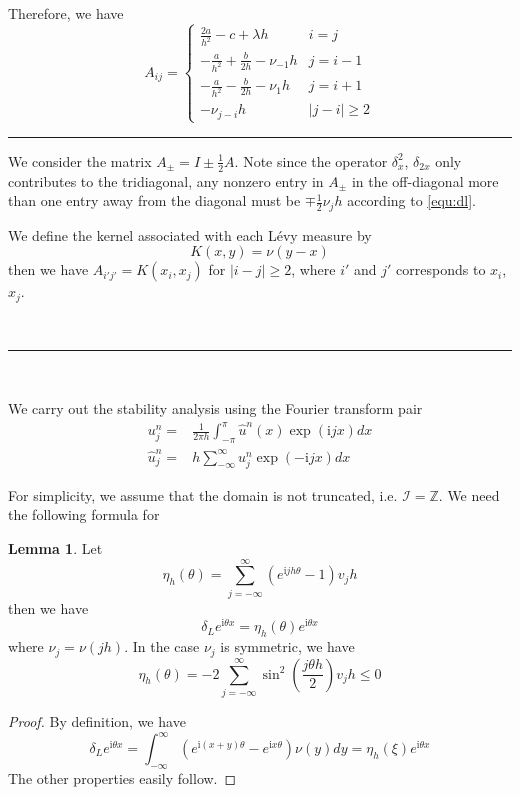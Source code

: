 \documentclass[10pt,a4paper]{article}
\newcommand{\ii}[0]{\mathrm{i}}
\theoremstyle{definition}
\newtheorem{lemma}{Lemma}
\begin{document}
Therefore, we have
\begin{equation}
  {A_{ij}} = 
  \begin{cases}
  	{\frac{{2a}}{{{h^2}}} - c + \lambda h} & i=j\\
{ - \frac{a}{{{h^2}}} + \frac{b}{{2h}} - {\nu _{ - 1}h}} & j=i-1\\
{ - \frac{a}{{{h^2}}} - \frac{b}{{2h}} - {\nu _1}h} & j=i+1\\
{ - {\nu _{j - i}h}} & |j-i|\geq 2
  \end{cases}
\end{equation}
\hrule

We consider the matrix $A_\pm = I \pm \frac{1}{2}A$. Note since the operator $\delta_x^2$, $\delta_{2x}$ only contributes to the tridiagonal, any nonzero entry in $A_\pm$ in the off-diagonal more than one entry away from the diagonal must be $\mp\frac{1}{2}\nu_jh$ according to \cref{equ:dl}. 

We define the kernel associated with each L\'evy measure by
\begin{equation}
	K(x,y) = \nu(y-x)
\end{equation}
then we have $A_{i'j'}=K(x_{i},x_{j})$ for $|i-j|\geq 2$, where $i'$ and $j'$ corresponds to $x_{i}$, $x_j$.

\

\hrule

\

We carry out the stability analysis using the Fourier transform pair
\begin{align}
	u_j^n =& \frac{1}{2\pi h}\int_{-\pi}^\pi \hat u^n(x) \exp(\ii j x)dx\\
	\hat u_j^n =&  h \sum_{-\infty}^\infty u_j^n \exp(-\ii jx)dx
\end{align}

For simplicity, we assume that the domain is not truncated, i.e. $\mathcal{I}=\mathbb{Z}$. We need the following formula for 
\begin{lemma}
	Let 
	\begin{equation}
		\eta_h(\theta) = \sum_{j=-\infty}^\infty (e^{\ii jh\theta}-1)v_jh
	\end{equation}
	then we have
	\begin{equation}
		\delta_L e^{\ii \theta x} = \eta_h(\theta) e^{\ii \theta x}
	\end{equation}
	where $\nu_j = \nu(jh)$. In the case $\nu_j$ is symmetric, we have
	\begin{equation}
		\eta_h(\theta) = -2\sum_{j=-\infty}^\infty \sin^2\left(\frac{j\theta h}{2} \right) v_jh\leq 0
	\end{equation}
\end{lemma}
\begin{proof}
	By definition, we have
	\[{\delta _L}{e^{\ii\theta x}} = \int_{ - \infty }^\infty  {\left( {{e^{\ii(x + y)\theta }} - {e^{\ii x\theta }}} \right)\nu (y)dy = {\eta _h}(\xi )} {e^{\ii\theta x}}\]
	The other properties easily follow. 
\end{proof}
\end{document}
